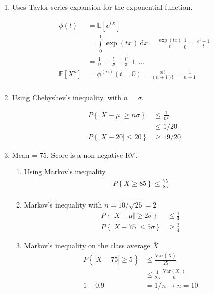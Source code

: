 \begin{enumerate}
	
	\item Uses Taylor series expansion for the exponential function.
	
		\begin{align}
			\phi (t) &= \mathbb{E}[e^{tX}] \nonumber \\
			&= \int\limits_{0}^{1} \exp(tx)\ \mathrm{d} x = \frac{\exp(tx)}{t} \Big|_0^1 = \frac{e^t - 1}{t}\nonumber \\
			&= \frac{1}{1!} + \frac{t}{2!} + \frac{t^2}{3!} + \dots \\
			\mathbb{E}[X^n] &= \phi^{(n)} (t = 0) = \frac{n!}{(n+1)!} = \frac{1}{n+1} \\
		\end{align}
	
	
	\item Using Chebyshev's inequality, with $ n = \sigma $.
	
		\begin{align}
			P\left\{\left| X - \mu \right| \geq n\sigma \right\} &\leq \frac{1}{n^2} \nonumber \\
			& \leq 1/20 \nonumber \\
			P\left\{\left| X - 20 \right| \leq 20 \right\} &\geq 19/20
		\end{align}
	
	
	\item Mean = 75. Score is a non-negative RV.
	
		\begin{enumerate}
			
			\item Using Markov's inequality\\
			\begin{align}
				P \left\{X \geq 85 \right\} \leq \frac{75}{85} \\
			\end{align}
			
			\item Markov's inequality with $ n = 10/\sqrt{25} = 2 $\\
			\begin{align}
				P\left\{\left| X - \mu \right| \geq 2 \sigma \right\} &\leq \frac{1}{4} \nonumber \\
				P\left\{\left| X - 75 \right| \leq 5 \sigma \right\} & \geq \frac{3}{4}
			\end{align}
			
			\item Markov's inequality on the class average $ \bar{X} $ \\
			\begin{align}
				P\left\{\left| \bar{X} - 75 \right| \geq 5 \right\} &\leq \frac{\mathrm{Var}(\bar{X})}{25} \nonumber \\
				& \leq \frac{1}{25}\ \frac{\mathrm{Var}(X_1)}{n} \\
				1 - 0.9 &= 1/n \to n = 10
			\end{align}
		\end{enumerate}
	

\end{enumerate}
